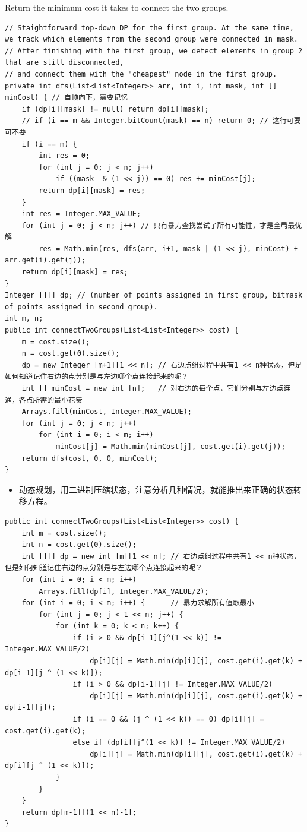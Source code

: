 \documentclass[9pt, b5paper]{article}
\begin{document}
Return the minimum cost it takes to connect the two groups.
\begin{verbatim}
// Staightforward top-down DP for the first group. At the same time, we track which elements from the second group were connected in mask.
// After finishing with the first group, we detect elements in group 2 that are still disconnected,
// and connect them with the "cheapest" node in the first group.
private int dfs(List<List<Integer>> arr, int i, int mask, int [] minCost) { // 自顶向下，需要记忆
    if (dp[i][mask] != null) return dp[i][mask];
    // if (i == m && Integer.bitCount(mask) == n) return 0; // 这行可要可不要
    if (i == m) {       
        int res = 0;
        for (int j = 0; j < n; j++) 
            if ((mask  & (1 << j)) == 0) res += minCost[j];
        return dp[i][mask] = res;
    }
    int res = Integer.MAX_VALUE;
    for (int j = 0; j < n; j++) // 只有暴力查找尝试了所有可能性，才是全局最优解
        res = Math.min(res, dfs(arr, i+1, mask | (1 << j), minCost) + arr.get(i).get(j));
    return dp[i][mask] = res;
}
Integer [][] dp; // (number of points assigned in first group, bitmask of points assigned in second group).
int m, n;
public int connectTwoGroups(List<List<Integer>> cost) {
    m = cost.size();
    n = cost.get(0).size();
    dp = new Integer [m+1][1 << n]; // 右边点组过程中共有1 << n种状态，但是如何知道记住右边的点分别是与左边哪个点连接起来的呢？
    int [] minCost = new int [n];   // 对右边的每个点，它们分别与左边点连通，各点所需的最小花费
    Arrays.fill(minCost, Integer.MAX_VALUE);
    for (int j = 0; j < n; j++) 
        for (int i = 0; i < m; i++) 
            minCost[j] = Math.min(minCost[j], cost.get(i).get(j));
    return dfs(cost, 0, 0, minCost);
}
\end{verbatim}
\begin{itemize}
\item 动态规划，用二进制压缩状态，注意分析几种情况，就能推出来正确的状态转移方程。
\end{itemize}
\begin{verbatim}
public int connectTwoGroups(List<List<Integer>> cost) { 
    int m = cost.size();
    int n = cost.get(0).size();
    int [][] dp = new int [m][1 << n]; // 右边点组过程中共有1 << n种状态，但是如何知道记住右边的点分别是与左边哪个点连接起来的呢？
    for (int i = 0; i < m; i++) 
        Arrays.fill(dp[i], Integer.MAX_VALUE/2);
    for (int i = 0; i < m; i++) {      // 暴力求解所有值取最小
        for (int j = 0; j < 1 << n; j++) {
            for (int k = 0; k < n; k++) {
                if (i > 0 && dp[i-1][j^(1 << k)] != Integer.MAX_VALUE/2) 
                    dp[i][j] = Math.min(dp[i][j], cost.get(i).get(k) + dp[i-1][j ^ (1 << k)]);
                if (i > 0 && dp[i-1][j] != Integer.MAX_VALUE/2)
                    dp[i][j] = Math.min(dp[i][j], cost.get(i).get(k) + dp[i-1][j]);
                if (i == 0 && (j ^ (1 << k)) == 0) dp[i][j] = cost.get(i).get(k);
                else if (dp[i][j^(1 << k)] != Integer.MAX_VALUE/2)
                    dp[i][j] = Math.min(dp[i][j], cost.get(i).get(k) + dp[i][j ^ (1 << k)]);
            }
        }
    }
    return dp[m-1][(1 << n)-1];
}
\end{verbatim}
\end{document}
